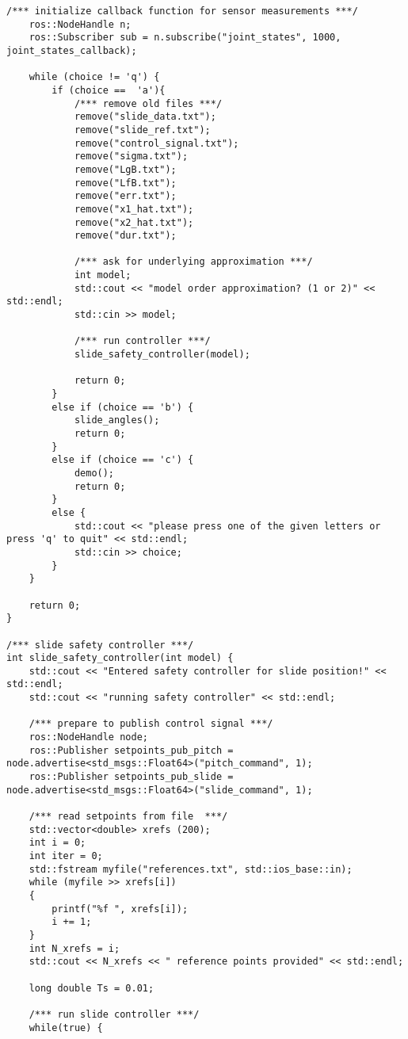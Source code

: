 \begin{lstlisting}[language=gedit]
    /*** initialize callback function for sensor measurements ***/
    ros::NodeHandle n;
    ros::Subscriber sub = n.subscribe("joint_states", 1000, joint_states_callback);

    while (choice != 'q') {
        if (choice ==  'a'){
            /*** remove old files ***/
            remove("slide_data.txt"); 
            remove("slide_ref.txt");
            remove("control_signal.txt");
            remove("sigma.txt");
            remove("LgB.txt");
            remove("LfB.txt");
            remove("err.txt");
            remove("x1_hat.txt");
            remove("x2_hat.txt");
            remove("dur.txt");

            /*** ask for underlying approximation ***/ 
            int model;
            std::cout << "model order approximation? (1 or 2)" << std::endl;
            std::cin >> model;

            /*** run controller ***/
            slide_safety_controller(model);

            return 0;
        }
        else if (choice == 'b') {
            slide_angles();
            return 0;
        }
        else if (choice == 'c') {
            demo();
            return 0;
        }
        else {
            std::cout << "please press one of the given letters or press 'q' to quit" << std::endl;
            std::cin >> choice;
        }
    }

    return 0;
}

/*** slide safety controller ***/
int slide_safety_controller(int model) {
    std::cout << "Entered safety controller for slide position!" << std::endl;
    std::cout << "running safety controller" << std::endl;
   
    /*** prepare to publish control signal ***/ 
    ros::NodeHandle node;
    ros::Publisher setpoints_pub_pitch = node.advertise<std_msgs::Float64>("pitch_command", 1);
    ros::Publisher setpoints_pub_slide = node.advertise<std_msgs::Float64>("slide_command", 1);

    /*** read setpoints from file  ***/
    std::vector<double> xrefs (200);
    int i = 0;
    int iter = 0;
    std::fstream myfile("references.txt", std::ios_base::in);
    while (myfile >> xrefs[i])
    {
        printf("%f ", xrefs[i]);
        i += 1; 
    }
    int N_xrefs = i;
    std::cout << N_xrefs << " reference points provided" << std::endl;

    long double Ts = 0.01;

    /*** run slide controller ***/
    while(true) {


\end{lstlisting}
